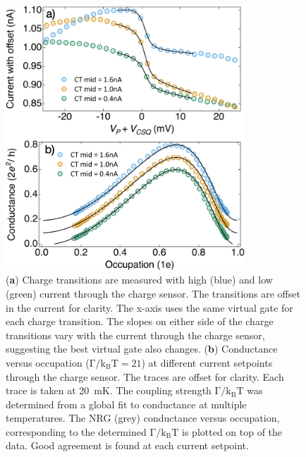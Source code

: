 \begin{figure}[!bht]
 \begin{center}
 \includegraphics[width=0.8\textwidth]{figures/ch3/crop_FiguresMaster.017.png}
 \caption[Conductance vs. Occupation : Varying the current through the charge sensor]{\label{fig:ch3/cond_occ_QPC_vs_ct} 
 (\textbf{a}) Charge transitions are measured with high (blue) and low (green) current through the charge sensor. The transitions are offset in the current for clarity. The x-axis uses the same virtual gate for each charge transition. The slopes on either side of the charge transitions vary with the current through the charge sensor, suggesting the best virtual gate also changes. (\textbf{b}) Conductance versus occupation ($\mathrm{\Gamma/k_BT=21}$) at different current setpoints through the charge sensor. The traces are offset for clarity. Each trace is taken at \qty{20}{mK}. The coupling strength $\mathrm{\Gamma/k_BT}$ was determined from a global fit to conductance at multiple temperatures. The NRG (grey) conductance versus occupation, corresponding to the determined $\mathrm{\Gamma/k_BT}$ is plotted on top of the data. Good agreement is found at each current setpoint.}
 \end{center}
\end{figure}


